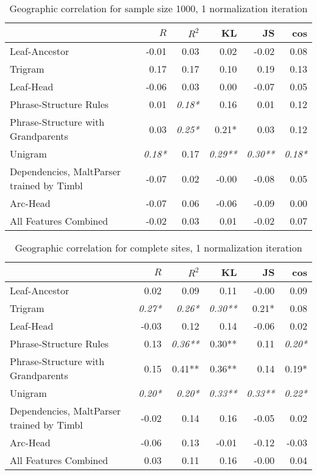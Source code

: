 \begin{table}
\begin{tabular}{l|rrrrr}
& $R$ & $R^2$ & KL & JS & cos  \\ \hline
  Leaf-Ancestor&-0.01 & 0.03 & 0.02 & -0.02 & 0.08\\
  Trigram&0.17 & 0.17 & 0.10 & 0.19 & 0.13\\
  Leaf-Head&-0.06 & 0.03 & 0.00 & -0.07 & 0.05\\
  Phrase-Structure Rules&0.01 & \textit{0.18*} & 0.16 & 0.01 & 0.12\\
  Phrase-Structure with Grandparents&0.03 & \textit{0.25*} & 0.21* & 0.03 & 0.12\\
  Unigram&\textit{0.18*} & 0.17 & \textit{0.29**} & \textit{0.30**} & \textit{0.18*}\\
  Dependencies, MaltParser trained by Timbl&-0.07 & 0.02 & -0.00 & -0.08 & 0.05\\
  Arc-Head&-0.07 & 0.06 & -0.06 & -0.09 & 0.00\\
  All Features Combined&-0.02 & 0.03 & 0.01 & -0.02 & 0.07\\
\end{tabular}
 \caption{Geographic correlation for sample size 1000, 1 normalization iteration}
 \label{cor-1-1000}
\end{table}

\begin{table}
\begin{tabular}{l|rrrrr}
& $R$ & $R^2$ & KL & JS & cos  \\ \hline
  Leaf-Ancestor&0.02 & 0.09 & 0.11 & -0.00 & 0.09\\
  Trigram&\textit{0.27*} & \textit{0.26*} & \textit{0.30**} & 0.21* & 0.08\\
  Leaf-Head&-0.03 & 0.12 & 0.14 & -0.06 & 0.02\\
  Phrase-Structure Rules&0.13 & \textit{0.36**} & 0.30** & 0.11 & \textit{0.20*}\\
  Phrase-Structure with Grandparents&0.15 & 0.41** & 0.36** & 0.14 & 0.19*\\
  Unigram&\textit{0.20*} & \textit{0.20*} & \textit{0.33**} & \textit{0.33**} & \textit{0.22*}\\
  Dependencies, MaltParser trained by Timbl&-0.02 & 0.14 & 0.16 & -0.05 & 0.02\\
  Arc-Head&-0.06 & 0.13 & -0.01 & -0.12 & -0.03\\
  All Features Combined&0.03 & 0.11 & 0.16 & -0.00 & 0.04\\
\end{tabular}
 \caption{Geographic correlation for complete sites, 1 normalization iteration}
 \label{cor-1-full}
\end{table}

